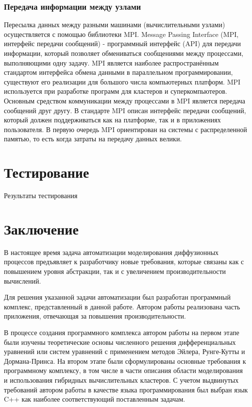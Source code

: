\documentclass[a4paper, 14pt]{extarticle}
\theoremstyle{definition}
\begin{document}
\subsubsection{Передача информации между узлами}

\par Пересылка данных между разными машинами (вычислительными узлами) осуществляется с помощью библиотеки MPI. Message Passing Interface (MPI, интерфейс передачи сообщений) - программный интерфейс (API) для передачи информации, который позволяет обмениваться сообщениями между процессами, выполняющими одну задачу. MPI является наиболее распространённым стандартом интерфейса обмена данными в параллельном программировании, существуют его реализации для большого числа компьютерных платформ. MPI используется при разработке программ для кластеров и суперкомпьютеров. Основным средством коммуникации между процессами в MPI является передача сообщений друг другу. В стандарте MPI описан интерфейс передачи сообщений, который должен поддерживаться как на платформе, так и в приложениях пользователя. В первую очередь MPI ориентирован на системы с распределенной памятью, то есть когда затраты на передачу данных велики.





\section{Тестирование}
Результаты тестирования






\section*{Заключение}

\par В настоящее время задача автоматизации моделирования диффузионных процессов предъявляет к разработчику новые требования, которые связаны как с повышением уровня абстракции, так и с увеличением производительности вычислений.

\par Для решения указанной задачи автоматизации был разработан программный комплекс, представленный в данной работе. Автором работы реализована часть приложения, отвечающая за повышения производительности.

\par В процессе создания программного комплекса автором работы на первом этапе были изучены теоретические основы численного решения дифференциальных уравнений или систем уравнений с применением методов Эйлера, Рунге-Кутты и Дормана-Принса. На втором этапе были сформулированы основные требования к программному комплексу, в том числе в части описания области моделирования и использования гибридных вычислительных кластеров. С учетом выдвинутых требований автором работы в качестве языка программирования был выбран язык C++ как наиболее соответствующий поставленным задачам.
\end{document}
